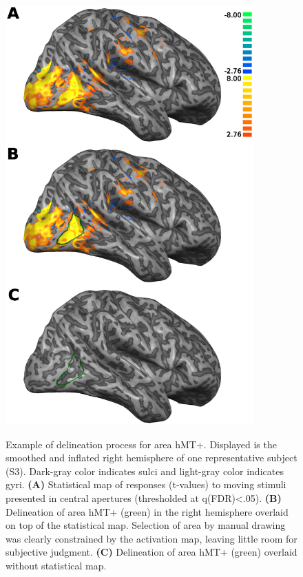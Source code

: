 \begin{figure}[htbp!]
\captionsetup{labelformat=empty}
\centering
\includegraphics[width=0.85\textwidth]{figures/chapter_03_SI/figS1.eps}
\caption{}
\end{figure}

\begin{figure}[ht!]
\ContinuedFloat
\captionsetup{labelformat=adja-page}
\caption{Example of delineation process for area hMT+. Displayed is the smoothed and inflated right hemisphere of one representative subject (S3). Dark-gray color indicates sulci and light-gray color indicates gyri. \textbf{(A)} Statistical map of responses (t-values) to moving stimuli presented in central apertures (thresholded at q(FDR)\textless.05). \textbf{(B)} Delineation of area hMT+ (green) in the right hemisphere overlaid on top of the statistical map. Selection of area by manual drawing was clearly constrained by the activation map, leaving little room for subjective judgment. \textbf{(C)} Delineation of area hMT+ (green) overlaid without statistical map.}
\label{fig:figD_roiSel}
\noindent\hrulefill
\end{figure}

